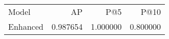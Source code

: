 \begin{tabular}{lrrr}
Model & AP & P@5 & P@10 \\
Enhanced & 0.987654 & 1.000000 & 0.800000 \\
\end{tabular}
